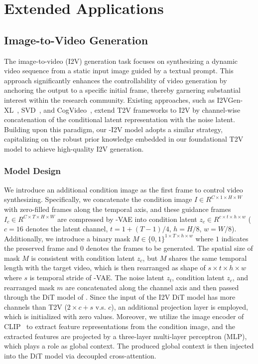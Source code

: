 \section{Extended Applications}
\label{sec:applications}


\subsection{Image-to-Video Generation}
\label{sec:i2v}

The image-to-video (I2V) generation task focuses on synthesizing a dynamic video sequence from a static input image guided by a textual prompt. 
%
This approach significantly enhances the controllability of video generation by anchoring the output to a specific initial frame, thereby garnering substantial interest within the research community.
%
Existing approaches, such as I2VGen-XL~\citep{zhang2023i2vgen}, SVD~\citep{blattmann2023svd}, and CogVideo~\citep{cogvideox}, extend T2V frameworks to I2V by channel-wise concatenation of the conditional latent representation with the noise latent. 
%
Building upon this paradigm, our \method-I2V model adopts a similar strategy, capitalizing on the robust prior knowledge embedded in our foundational T2V model to achieve high-quality I2V generation.


\subsubsection{Model Design}


We introduce an additional condition image as the first frame to control video synthesizing. 
Specifically, we concatenate the condition image $I \in {R^{C\times 1\times H\times W}}$ with zero-filled frames along the temporal axis, and these guidance frames $I_{c} \in {R^{C\times T\times H\times W}}$ are compressed by \method-VAE into condition latent $z_{c} \in {R^{c\times t\times h\times w}}$  ($c=16$ denotes the latent channel, $t=1+(T-1)/4$, $h=H/8$, $w=W/8$). 
Additionally, we introduce a binary mask $M \in \{0,1\}^{1\times T\times h\times w}$ where $1$ indicates the preserved frame and $0$ denotes the frames to be generated. 
The spatial size of mask $M$ is consistent with condition latent $z_{c}$, but $M$ shares the same temporal length with the target video, which is then rearranged as shape of ${s\times t\times h\times w}$ where $s$ is temporal stride of \method-VAE. 
The noise latent $z_t$, condition latent $z_c$, and rearranged mask $m $ are concatenated along the channel axis and then passed through the DiT model of \method. 
Since the input of the I2V DiT model has more channels than T2V (\ie $2\times c + s$ v.s. $c$), an additional projection layer is employed, which is initialized with zero values.
Moreover, we utilize the image encoder of CLIP~\citep{radford2021learning} to extract feature representations from the condition image, and the extracted features are projected by a three-layer multi-layer perceptron (MLP), which plays a role as global context. 
The produced global context is then injected into the DiT model via decoupled cross-attention. 

